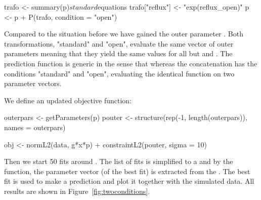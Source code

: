 \documentclass[article]{jss}
\begin{document}
\begin{CodeChunk}
\begin{CodeInput}
trafo <- summary(p)$standard$equations
trafo["reflux"] <- "exp(reflux_open)"
p <- p + P(trafo, condition = "open")
\end{CodeInput}
\end{CodeChunk}

Compared to the situation before we have gained the outer parameter . Both transformations, "standard" and "open", evaluate the same vector of outer parameters meaning that they yield the same values for all but  and . The prediction function  is generic in the sense that  whereas the concatenation  has the conditions "standard" and "open", evaluating the identical function  on two parameter vectors.

We define an updated objective function:
\begin{CodeChunk}
\begin{CodeInput}
outerpars <- getParameters(p)
pouter <- structure(rep(-1, length(outerpars)), names = outerpars)

obj <- normL2(data, g*x*p) + constraintL2(pouter, sigma = 10)
\end{CodeInput}
\end{CodeChunk}

Then we start 50 fits around . The list of fits is simplified to a  and by the  function, the parameter vector (of the best fit) is extracted from the . The best fit is used to make a prediction and plot it together with the simulated data. All results are shown in Figure~\ref{fig:twoconditions}.
\end{document}
